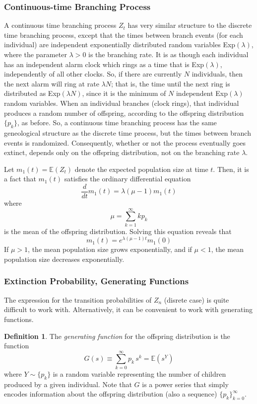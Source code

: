 \documentclass{article}
\theoremstyle{remark}
\theoremstyle{definition}
\newtheorem{definition}{Definition}[section]
\begin{document}
\subsubsection{Continuous-time Branching Process}
A continuous time branching process $Z_t$ has very similar structure to the discrete time branching process, except that the times between branch events (for each individual) are independent exponentially distributed random variables Exp$(\lambda)$, where the parameter $\lambda> 0$ is the branching rate. It is as though each individual has an independent alarm clock which rings as a time that is Exp$(\lambda)$, independently of all other clocks. So, if there are currently $N$ individuals, then the next alarm will ring at rate $\lambda N$; that is, the time until the next ring is distributed as Exp$(\lambda N)$, since it is the minimum of $N$ independent Exp$(\lambda)$ random variables. When an individual branches (clock rings), that individual produces a random number of offspring, according to the offspring distribution $\{p_k\}$, as before. So, a continuous time branching process has the same geneological structure as the discrete time process, but the times between branch events is randomized. Consequently, whether or not the process eventually goes extinct, depends only on the offspring distribution, not on the branching rate $\lambda$. 

Let $m_1(t) = \mathbb{E}(Z_t)$ denote the expected population size at time $t$. Then, it is a fact that $m_1(t)$ satisfies the ordinary differential equation
\[\frac{d}{d t} m_1 (t) = \lambda(\mu - 1) m_1 (t)\]
where 
\[\mu = \sum_{k=1}^\infty k p_k\]
is the mean of the offspring distribution. Solving this equation reveals that 
\[m_1 (t) = e^{\lambda (\mu-1) t} m_1 (0)\]
If $\mu > 1$, the mean population size grows exponentially, and if $\mu < 1$, the mean population size decreases exponentially. 

\subsubsection{Extinction Probability, Generating Functions}
The expression for the transition probabilities of $Z_n$ (disrete case) is quite difficult to work with. Alternatively, it can be convenient to work with generating functions. 

\begin{definition}
The \textit{generating function} for the offspring distribution is the function 
\[G(s) \equiv \sum_{k=0}^\infty p_k \, s^k = \mathbb{E}(s^Y)\]
where $Y \sim \{p_k\}$ is a random variable representing the number of children produced by a given individual. Note that $G$ is a power series that simply encodes information about the offspring distribution (also a sequence) $\{p_k\}_{k=0}^\infty$. 
\end{definition}
\end{document}
